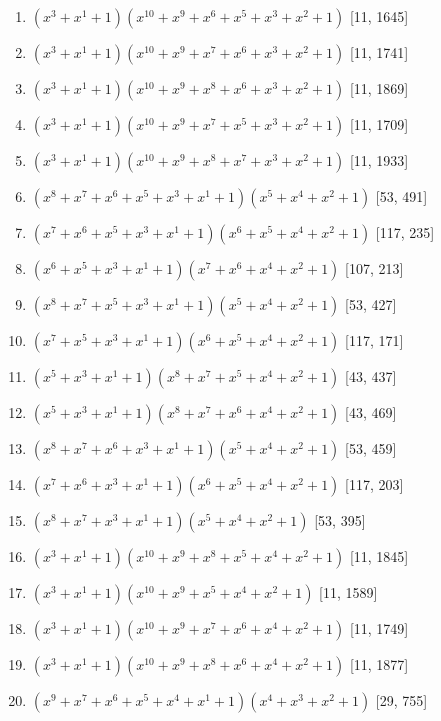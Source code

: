 \documentclass[10pt,twocolumn]{article}
\begin{document}
\begin{enumerate}
\item $(x^{3} + x^{1} + 1)(x^{10} + x^{9} + x^{6} + x^{5} + x^{3} + x^{2} + 1)$  [11, 1645]
\item $(x^{3} + x^{1} + 1)(x^{10} + x^{9} + x^{7} + x^{6} + x^{3} + x^{2} + 1)$  [11, 1741]
\item $(x^{3} + x^{1} + 1)(x^{10} + x^{9} + x^{8} + x^{6} + x^{3} + x^{2} + 1)$  [11, 1869]
\item $(x^{3} + x^{1} + 1)(x^{10} + x^{9} + x^{7} + x^{5} + x^{3} + x^{2} + 1)$  [11, 1709]
\item $(x^{3} + x^{1} + 1)(x^{10} + x^{9} + x^{8} + x^{7} + x^{3} + x^{2} + 1)$  [11, 1933]
\item $(x^{8} + x^{7} + x^{6} + x^{5} + x^{3} + x^{1} + 1)(x^{5} + x^{4} + x^{2} + 1)$  [53, 491]
\item $(x^{7} + x^{6} + x^{5} + x^{3} + x^{1} + 1)(x^{6} + x^{5} + x^{4} + x^{2} + 1)$  [117, 235]
\item $(x^{6} + x^{5} + x^{3} + x^{1} + 1)(x^{7} + x^{6} + x^{4} + x^{2} + 1)$  [107, 213]
\item $(x^{8} + x^{7} + x^{5} + x^{3} + x^{1} + 1)(x^{5} + x^{4} + x^{2} + 1)$  [53, 427]
\item $(x^{7} + x^{5} + x^{3} + x^{1} + 1)(x^{6} + x^{5} + x^{4} + x^{2} + 1)$  [117, 171]
\item $(x^{5} + x^{3} + x^{1} + 1)(x^{8} + x^{7} + x^{5} + x^{4} + x^{2} + 1)$  [43, 437]
\item $(x^{5} + x^{3} + x^{1} + 1)(x^{8} + x^{7} + x^{6} + x^{4} + x^{2} + 1)$  [43, 469]
\item $(x^{8} + x^{7} + x^{6} + x^{3} + x^{1} + 1)(x^{5} + x^{4} + x^{2} + 1)$  [53, 459]
\item $(x^{7} + x^{6} + x^{3} + x^{1} + 1)(x^{6} + x^{5} + x^{4} + x^{2} + 1)$  [117, 203]
\item $(x^{8} + x^{7} + x^{3} + x^{1} + 1)(x^{5} + x^{4} + x^{2} + 1)$  [53, 395]
\item $(x^{3} + x^{1} + 1)(x^{10} + x^{9} + x^{8} + x^{5} + x^{4} + x^{2} + 1)$  [11, 1845]
\item $(x^{3} + x^{1} + 1)(x^{10} + x^{9} + x^{5} + x^{4} + x^{2} + 1)$  [11, 1589]
\item $(x^{3} + x^{1} + 1)(x^{10} + x^{9} + x^{7} + x^{6} + x^{4} + x^{2} + 1)$  [11, 1749]
\item $(x^{3} + x^{1} + 1)(x^{10} + x^{9} + x^{8} + x^{6} + x^{4} + x^{2} + 1)$  [11, 1877]
\item $(x^{9} + x^{7} + x^{6} + x^{5} + x^{4} + x^{1} + 1)(x^{4} + x^{3} + x^{2} + 1)$  [29, 755]

\end{enumerate}
\end{document}
